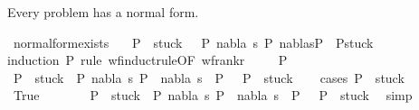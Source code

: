 \begin{isabellebody}
\begin{isamarkuptext}
Every problem has a normal form.%
\end{isamarkuptext}\isamarkuptrue%
\isamarkupfalse%
\ normal{\isacharunderscore}{\kern0pt}form{\isacharunderscore}{\kern0pt}exists{\isacharcolon}{\kern0pt}\isanewline
\ \ \ {\isachardoublequoteopen}P\ {\isasymin}\ stuck\ {\isasymor}\ {\isacharparenleft}{\kern0pt}{\isasymexists}\ P{}\ nabla\ s{\isachardot}{\kern0pt}\ P\ {\isasymTurnstile}{\isacharparenleft}{\kern0pt}nabla{\isacharcomma}{\kern0pt}s{\isacharparenright}{\kern0pt}{\isasymRightarrow}P{}\ {\isasymand}\ P{}{\isasymin}stuck\ {\isacharparenright}{\kern0pt}{\isachardoublequoteclose}\isanewline
%
\isadelimproof
%
\endisadelimproof
%
\isatagproof
{}\isamarkupfalse%
{\isacharparenleft}{\kern0pt}induction\ P\ rule{\isacharcolon}{\kern0pt}\ wf{\isacharunderscore}{\kern0pt}induct{\isacharunderscore}{\kern0pt}rule{\isacharbrackleft}{\kern0pt}OF\ wf{\isacharunderscore}{\kern0pt}rank{\isacharunderscore}{\kern0pt}r{\isacharbrackright}{\kern0pt}{\isacharparenright}{\kern0pt}\isanewline
\ \ \isamarkupfalse%
\ {\isacharparenleft}{\kern0pt}{}\ P{\isacharparenright}{\kern0pt}\isanewline
\ \ \isamarkupfalse%
\ \isamarkupfalse%
\ {\isachardoublequoteopen}P\ {\isasymin}\ stuck\ {\isasymor}\ {\isacharparenleft}{\kern0pt}{\isasymexists}P{}\ nabla\ s{\isachardot}{\kern0pt}\ P\ {\isasymTurnstile}\ {\isacharparenleft}{\kern0pt}nabla{\isacharcomma}{\kern0pt}\ s{\isacharparenright}{\kern0pt}\ {\isasymRightarrow}\ P{}\ \ {\isasymand}\ P{}\ {\isasymin}\ stuck{\isacharparenright}{\kern0pt}{\isachardoublequoteclose}\isanewline
\ \ \isamarkupfalse%
\ {\isacharparenleft}{\kern0pt}cases\ {\isachardoublequoteopen}P\ {\isasymin}\ stuck{\isachardoublequoteclose}{\isacharparenright}{\kern0pt}\isanewline
\ \ \ \ \isamarkupfalse%
\ True\isanewline
\ \ \ \ \isamarkupfalse%
\ \isamarkupfalse%
\ {\isachardoublequoteopen}P\ {\isasymin}\ stuck\ {\isasymor}\ {\isacharparenleft}{\kern0pt}{\isasymexists}P{}\ nabla\ s{\isachardot}{\kern0pt}\ P\ {\isasymTurnstile}\ {\isacharparenleft}{\kern0pt}nabla{\isacharcomma}{\kern0pt}\ s{\isacharparenright}{\kern0pt}\ {\isasymRightarrow}\ P{}\ \ {\isasymand}\ P{}\ {\isasymin}\ stuck{\isacharparenright}{\kern0pt}{\isachardoublequoteclose}\ \isamarkupfalse%
\ simp\isanewline
\ \ \isamarkupfalse%

\end{isabellebody}
